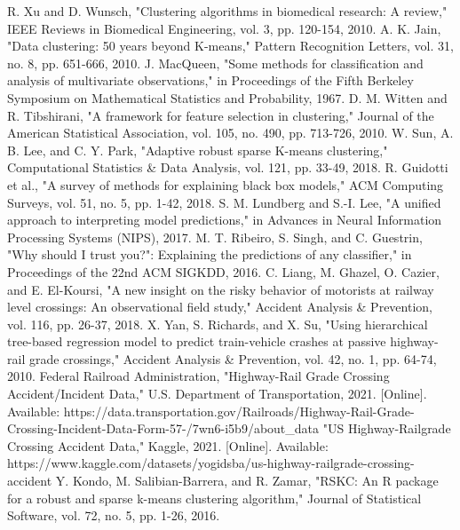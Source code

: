 \documentclass[conference]{IEEEtran}
\begin{document}
\begin{thebibliography}{00}
 R. Xu and D. Wunsch, "Clustering algorithms in biomedical research: A review," IEEE Reviews in Biomedical Engineering, vol. 3, pp. 120-154, 2010.
 A. K. Jain, "Data clustering: 50 years beyond K-means," Pattern Recognition Letters, vol. 31, no. 8, pp. 651-666, 2010.
 J. MacQueen, "Some methods for classification and analysis of multivariate observations," in Proceedings of the Fifth Berkeley Symposium on Mathematical Statistics and Probability, 1967.
 D. M. Witten and R. Tibshirani, "A framework for feature selection in clustering," Journal of the American Statistical Association, vol. 105, no. 490, pp. 713-726, 2010.
 W. Sun, A. B. Lee, and C. Y. Park, "Adaptive robust sparse K-means clustering," Computational Statistics \& Data Analysis, vol. 121, pp. 33-49, 2018.
 R. Guidotti et al., "A survey of methods for explaining black box models," ACM Computing Surveys, vol. 51, no. 5, pp. 1-42, 2018.
 S. M. Lundberg and S.-I. Lee, "A unified approach to interpreting model predictions," in Advances in Neural Information Processing Systems (NIPS), 2017.
 M. T. Ribeiro, S. Singh, and C. Guestrin, "Why should I trust you?": Explaining the predictions of any classifier," in Proceedings of the 22nd ACM SIGKDD, 2016.
 C. Liang, M. Ghazel, O. Cazier, and E. El-Koursi, "A new insight on the risky behavior of motorists at railway level crossings: An observational field study," Accident Analysis \& Prevention, vol. 116, pp. 26-37, 2018.
 X. Yan, S. Richards, and X. Su, "Using hierarchical tree-based regression model to predict train-vehicle crashes at passive highway-rail grade crossings," Accident Analysis \& Prevention, vol. 42, no. 1, pp. 64-74, 2010.
 Federal Railroad Administration, "Highway-Rail Grade Crossing Accident/Incident Data," U.S. Department of Transportation, 2021. [Online]. Available: https://data.transportation.gov/Railroads/Highway-Rail-Grade-Crossing-Incident-Data-Form-57-/7wn6-i5b9/about\_data
 "US Highway-Railgrade Crossing Accident Data," Kaggle, 2021. [Online]. Available: https://www.kaggle.com/datasets/yogidsba/us-highway-railgrade-crossing-accident
 Y. Kondo, M. Salibian-Barrera, and R. Zamar, "RSKC: An R package for a robust and sparse k-means clustering algorithm," Journal of Statistical Software, vol. 72, no. 5, pp. 1-26, 2016.

\end{thebibliography}
\end{document}
